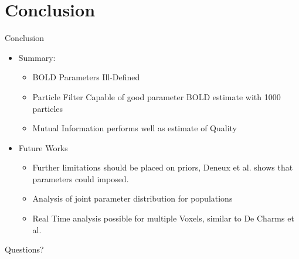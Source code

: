 \documentclass{beamer}
\begin{document}
\section{Conclusion}
\begin{frame}{Conclusion}
\begin{itemize}
    \item Summary:
    \begin{itemize}
    \item BOLD Parameters Ill-Defined
    \item Particle Filter Capable of good parameter BOLD estimate with 1000 particles
    \item Mutual Information performs well as estimate of Quality
    \end{itemize}
    \item Future Works
    \begin{itemize}
        \item Further limitations should be placed on priors, Deneux 
            et al. \cite{Deneux2006} shows that parameters could imposed.
        \item Analysis of joint parameter distribution for populations
        \item Real Time analysis possible for multiple Voxels, similar to
            De Charms et al. \cite{DeCharms2005}

    \end{itemize}
\end{itemize}
\end{frame}

\begin{frame}{Questions?}
\end{frame}


\begin{frame}[allowframebreaks]
  
  
\end{frame}
\end{document}
